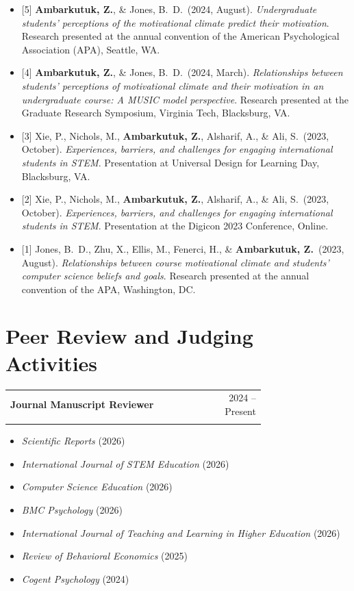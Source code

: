 \documentclass[letterpaper,11pt]{article}
\makeatletter
\newcommand{\entry}[3]{%
  \begin{tabular*}{\linewidth}[t]{@{}>{\raggedright\arraybackslash}p{0.74\linewidth}@{\extracolsep{\fill}}r@{}}
    \textbf{#1} & #2 \\
    \multicolumn{2}{@{}l@{}}{\textit{#3}} \\
  \end{tabular*}\par\vspace{1pt}}
\newenvironment{bullets}%
  {\begin{itemize}[leftmargin=1.2em, itemsep=1pt, parsep=0pt, topsep=1pt, label=\textbullet]}%
  {\end{itemize}\vspace{4pt}}
\newenvironment{refs}%
  {\begin{itemize}[leftmargin=2.2em, labelwidth=1.8em, labelsep=0.4em, align=left,
                   itemsep=3pt, parsep=0pt, topsep=2pt]}%
  {\end{itemize}}
\newcommand{\me}{\textbf{Ambarkutuk, Z.}}
\makeatother
\begin{document}
\begin{refs}
  \item[{[5]}] \me, \& Jones, B.\ D.\ (2024, August). \textit{Undergraduate students' perceptions of the motivational climate predict their motivation}. Research presented at the annual convention of the American Psychological Association (APA), Seattle, WA.
  \item[{[4]}] \me, \& Jones, B.\ D.\ (2024, March). \textit{Relationships between students' perceptions of motivational climate and their motivation in an undergraduate course: A MUSIC model perspective}. Research presented at the Graduate Research Symposium, Virginia Tech, Blacksburg, VA.
  \item[{[3]}] Xie, P., Nichols, M., \me, Alsharif, A., \& Ali, S.\ (2023, October). \textit{Experiences, barriers, and challenges for engaging international students in STEM}. Presentation at Universal Design for Learning Day, Blacksburg, VA.
  \item[{[2]}] Xie, P., Nichols, M., \me, Alsharif, A., \& Ali, S.\ (2023, October). \textit{Experiences, barriers, and challenges for engaging international students in STEM}. Presentation at the Digicon 2023 Conference, Online.
  \item[{[1]}] Jones, B.\ D., Zhu, X., Ellis, M., Fenerci, H., \& \me\ (2023, August). \textit{Relationships between course motivational climate and students' computer science beliefs and goals}. Research presented at the annual convention of the APA, Washington, DC.
\end{refs}

\section{Peer Review and Judging Activities}
\entry{Journal Manuscript Reviewer}{2024 -- Present}{7 peer-reviewed journals}
\begin{bullets}
  \item \textit{Scientific Reports} (2026)
  \item \textit{International Journal of STEM Education} (2026)
  \item \textit{Computer Science Education} (2026)
  \item \textit{BMC Psychology} (2026)
  \item \textit{International Journal of Teaching and Learning in Higher Education} (2026)
  \item \textit{Review of Behavioral Economics} (2025)
  \item \textit{Cogent Psychology} (2024)
\end{bullets}
\end{document}
